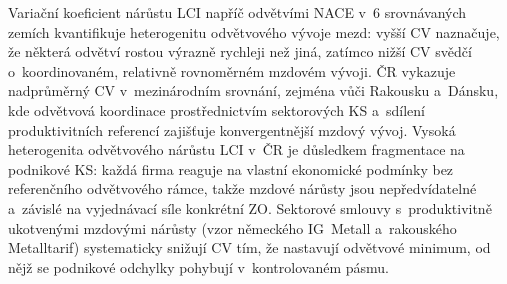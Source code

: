 Variační koeficient nárůstu \ac{LCI} napříč odvětvími \ac{NACE} v~6 srovnávaných zemích kvantifikuje heterogenitu odvětvového vývoje mezd: vyšší CV naznačuje, že některá odvětví rostou výrazně rychleji než jiná, zatímco nižší CV svědčí o~koordinovaném, relativně rovnoměrném mzdovém vývoji.
\Ac{ČR} vykazuje nadprůměrný CV v~mezinárodním srovnání, zejména vůči Rakousku a~Dánsku, kde odvětvová koordinace prostřednictvím sektorových \ac{KS} a~sdílení produktivitních referencí zajišťuje konvergentnější mzdový vývoj.
Vysoká heterogenita odvětvového nárůstu \ac{LCI} v~ČR je důsledkem fragmentace na podnikové \ac{KS}: každá firma reaguje na vlastní ekonomické podmínky bez referenčního odvětvového rámce, takže mzdové nárůsty jsou nepředvídatelné a~závislé na vyjednávací síle konkrétní \ac{ZO}.
Sektorové smlouvy s~produktivitně ukotvenými mzdovými nárůsty (vzor německého IG~Metall a~rakouského Metalltarif) systematicky snižují CV tím, že nastavují odvětvové minimum, od nějž se podnikové odchylky pohybují v~kontrolovaném pásmu.\par


